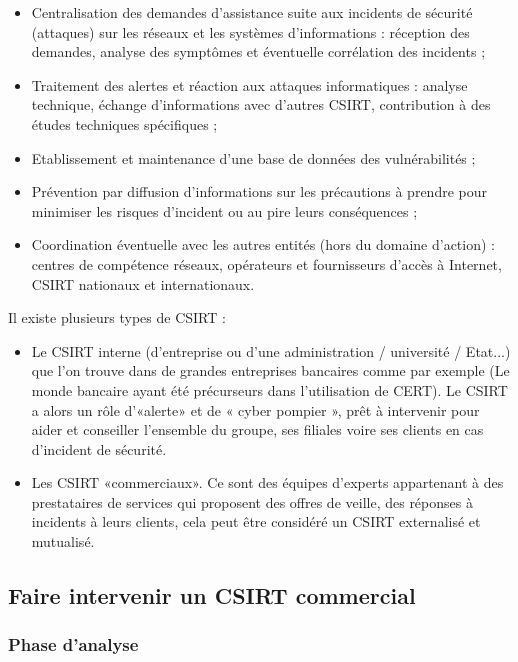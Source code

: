 \begin{itemize}
  \item Centralisation des demandes d’assistance suite aux incidents de sécurité (attaques) sur les réseaux et les systèmes d’informations : réception des demandes, analyse des symptômes et éventuelle corrélation des incidents ;
  \item Traitement des alertes et réaction aux attaques informatiques : analyse technique, échange d’informations avec d’autres CSIRT, contribution à des études techniques spécifiques ;
  \item Etablissement et maintenance d’une base de données des vulnérabilités ;
  \item Prévention par diffusion d’informations sur les précautions à prendre pour minimiser les risques d’incident ou au pire leurs conséquences ;
  \item Coordination éventuelle avec les autres entités (hors du domaine d’action) : centres de compétence réseaux, opérateurs et fournisseurs d’accès à Internet, CSIRT nationaux et internationaux.
\end{itemize}

Il existe plusieurs types de CSIRT :

\begin{itemize}
  \item  Le CSIRT interne (d’entreprise ou d’une administration / université / Etat...) que l'on trouve dans de grandes entreprises bancaires comme par exemple (Le monde bancaire ayant été précurseurs dans l'utilisation de CERT). Le CSIRT a alors un rôle d’«alerte» et de « cyber pompier », prêt à intervenir pour aider et conseiller l’ensemble du groupe, ses filiales voire ses clients en cas d’incident de sécurité.
  \item  Les CSIRT «commerciaux». Ce sont des équipes d’experts appartenant à des prestataires de services qui  proposent des offres de veille, des réponses à incidents à leurs clients, cela peut être  considéré  un CSIRT externalisé et mutualisé.
\end{itemize}
 
 \subsection{Faire intervenir un CSIRT commercial}
 
 \subsubsection{Phase d'analyse}

